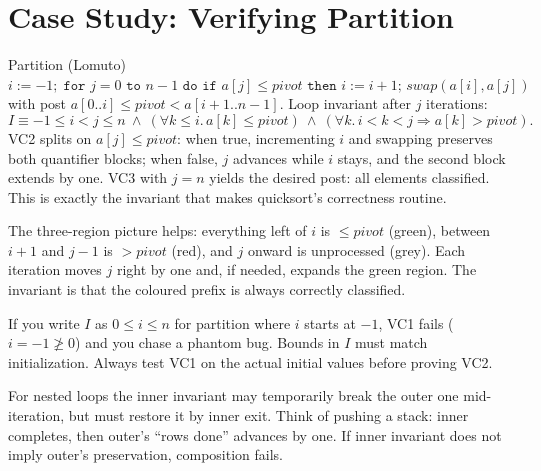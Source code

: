 \section{Case Study: Verifying Partition}
\label{sec:partition}
Partition (Lomuto) $i:=-1;\;\texttt{for }j=0\texttt{ to }n-1\texttt{ do if }a[j]\le pivot\texttt{ then }i:=i+1;\,swap(a[i],a[j])$ with post $a[0..i]\le pivot < a[i+1..n-1]$. Loop invariant after $j$ iterations:
\[
I\equiv -1\le i<j\le n\ \land\ (\forall k\le i.\,a[k]\le pivot)\ \land\ (\forall k.\,i<k<j\Rightarrow a[k]>pivot).
\]
VC2 splits on $a[j]\le pivot$: when true, incrementing $i$ and swapping preserves both quantifier blocks; when false, $j$ advances while $i$ stays, and the second block extends by one. VC3 with $j=n$ yields the desired post: all elements classified. This is exactly the invariant that makes quicksort's correctness routine.

The three-region picture helps: everything left of $i$ is $\le pivot$ (green), between $i+1$ and $j-1$ is $>pivot$ (red), and $j$ onward is unprocessed (grey). Each iteration moves $j$ right by one and, if needed, expands the green region. The invariant is that the coloured prefix is always correctly classified.

\begin{example}
If you write $I$ as $0\le i\le n$ for partition where $i$ starts at $-1$, VC1 fails ($i=-1\not\ge0$) and you chase a phantom bug. Bounds in $I$ must match initialization. Always test VC1 on the actual initial values before proving VC2.
\end{example}

\begin{remark}
For nested loops the inner invariant may temporarily break the outer one mid-iteration, but must restore it by inner exit. Think of pushing a stack: inner completes, then outer's ``rows done'' advances by one. If inner invariant does not imply outer's preservation, composition fails.
\end{remark}

